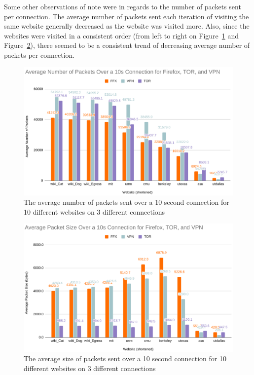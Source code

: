 \documentclass[11pt]{article}
\begin{document}
Some other observations of note were in regards to the number of packets sent per connection. The 
average number of packets sent each iteration of visiting the same website generally decreased as the
website was visited more. Also, since the websites were visited in a consistent order (from left to 
right on Figure~\ref{fig:avg_packets} and Figure~\ref{fig:avg_size}), there seemed to be a consistent
trend of decreasing average number of packets per connection. 
\begin{figure}[htbp]
  \centering
  \includegraphics[width=.82\linewidth]{./average_packets.png}
  \caption{\label{fig:avg_packets}
  The average number of packets sent over a 10 second connection for 10 different websites on 3 different connections}
\end{figure}
\begin{figure}[!hbtp]
  \centering
  \includegraphics[width=.82\linewidth]{./average_size.png}
  \caption{\label{fig:avg_size}
  The average size of packets sent over a 10 second connection for 10 different websites on 3 different connections}
\end{figure}
\end{document}
